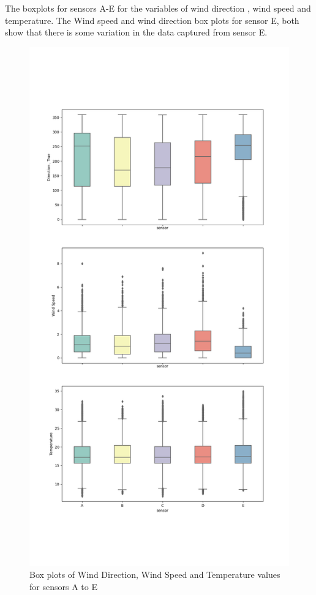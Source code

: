 \documentclass[a4paper]{article}
\begin{document}
The boxplots for sensors A-E for the variables of wind direction , wind speed and temperature. The Wind speed and wind direction box plots for sensor E, both show that there is some variation in the data captured from sensor E.
\begin{figure}[H]
\includegraphics[width=12cm]{images/a1_6.png}
\centering
\caption{Box plots of  Wind Direction, Wind Speed and Temperature values for sensors A to E}
\end{figure}
\end{document}
